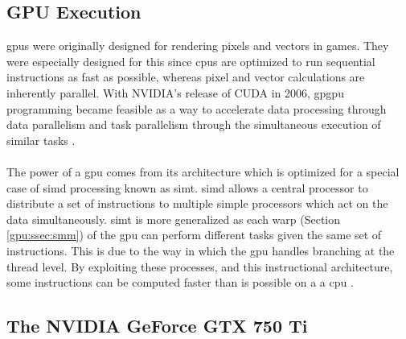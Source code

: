 \subsection{GPU Execution}\label{gpu:sec:opt}
\gls{gpu}s were originally designed for rendering pixels and vectors in games. They were especially designed for this since \gls{cpu}s are optimized to run sequential instructions as fast as possible, whereas pixel and vector calculations are inherently parallel. With NVIDIA's release of CUDA in 2006, \gls{gpgpu} programming became feasible as a way to accelerate data processing through data parallelism and task parallelism through the simultaneous execution of similar tasks \citep{cuda_home}.
\\
\\
The power of a \gls{gpu} comes from its architecture which is optimized for a special case of \gls{simd} processing known as \gls{simt}. \gls{simd} allows a central processor to distribute a set of instructions to multiple simple processors which act on the data simultaneously. \gls{simt} is more generalized as each warp (Section \ref{gpu:ssec:smm}) of the \gls{gpu} can perform different tasks given the same set of instructions. This is due to the way in which the \gls{gpu} handles branching at the thread level. By exploiting these processes, and this instructional architecture, some instructions can be computed faster than is possible on a  a \gls{cpu} \citep{vuduc2013brief}.
\subsection{The NVIDIA GeForce GTX 750 Ti}\label{gpu:sec:750}
%
